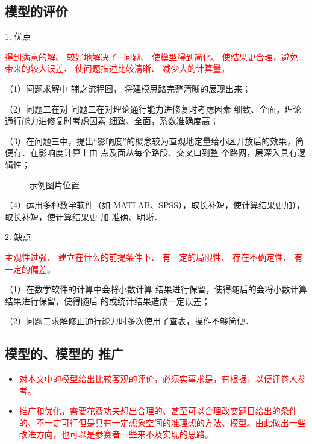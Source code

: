 \documentclass[a4paper]{nmmcm}
\begin{document}
\subsection{模型的评价}


1. 优点

\textcolor{red}{得到满意的解、
较好地解决了$\cdots$问题、
使模型得到简化、
使结果更合理，避免…带来的较大误差、
使问题描述比较清晰、
减少大的计算量。
}

（1）问题求解中 辅之流程图， 将建模思路完整清晰的展现出来；

（2）问题二在对 问题二在对理论通行能力进修复时考虑因素 细致、全面，理论通行能力进修复时考虑因素
 细致、全面，系数准确度高；

（3）在问题三中，提出“影响度”的概念较为直观地定量给小区开放后的效果，简便有．在影响度计算上由
点及面从每个路段、交叉口到整 个路网，层深入具有逻辑性；

\begin{figure}[h!t]
\centerline{}
\caption{\song\wuhao 示例图片位置}
\end{figure}


（4）运用多种数学软件（如 MATLAB、SPSS），取长补短，使计算结果更加），取长补短，使计算结果更
加 准确、明晰．

2. 缺点

\textcolor{red}{主观性过强、
建立在什么的前提条件下、
有一定的局限性、
存在不确定性、
有一定的偏差。
}

（1）在数学软件的计算中会将小数计算 结果进行保留，使得随后的会将小数计算 结果进行保留，使得随后
的或统计结果造成一定误差；

（2）问题二求解修正通行能力时多次使用了查表，操作不够简便．

\subsection{模型的、模型的 推广}

\begin{itemize}

\item \textcolor{red}{对本文中的模型给出比较客观的评价，必须实事求是，有根据，以便评卷人参考。}

\item \textcolor{red}{推广和优化，需要花费功夫想出合理的、甚至可以合理改变题目给出的条件的、不一定可行但是具有一定想象空间的准理想的方法、模型。由此做出一些改进方向，也可以是参赛者一些来不及实现的思路。}
\end{itemize}
\end{document}
